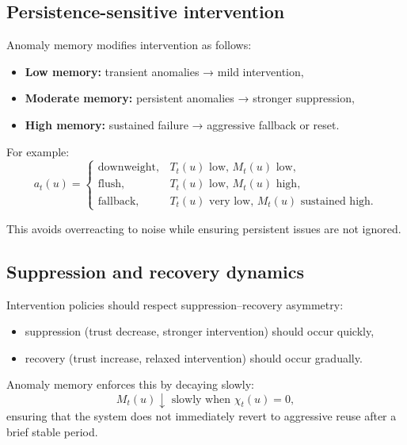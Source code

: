 \documentclass[11pt,letterpaper]{article}
\theoremstyle{gcresult}
\theoremstyle{definition}
\begin{document}

\subsection{Persistence-sensitive intervention}

Anomaly memory modifies intervention as follows:
\begin{itemize}[leftmargin=1.5em]
    \item \textbf{Low memory:} transient anomalies → mild intervention,
    \item \textbf{Moderate memory:} persistent anomalies → stronger suppression,
    \item \textbf{High memory:} sustained failure → aggressive fallback or reset.
\end{itemize}

For example:
\begin{equation}
a_t(u)=
\begin{cases}
\mathrm{downweight}, & T_t(u)\text{ low, }M_t(u)\text{ low},\\
\mathrm{flush}, & T_t(u)\text{ low, }M_t(u)\text{ high},\\
\mathrm{fallback}, & T_t(u)\text{ very low, }M_t(u)\text{ sustained high}.
\end{cases}
\end{equation}

This avoids overreacting to noise while ensuring persistent issues are not ignored.


\subsection{Suppression and recovery dynamics}

Intervention policies should respect suppression–recovery asymmetry:

\begin{itemize}[leftmargin=1.5em]
    \item suppression (trust decrease, stronger intervention) should occur quickly,
    \item recovery (trust increase, relaxed intervention) should occur gradually.
\end{itemize}

Anomaly memory enforces this by decaying slowly:
\begin{equation}
M_t(u)\downarrow \text{ slowly when }\chi_t(u)=0,
\end{equation}
ensuring that the system does not immediately revert to aggressive reuse after a brief stable period.
\end{document}

